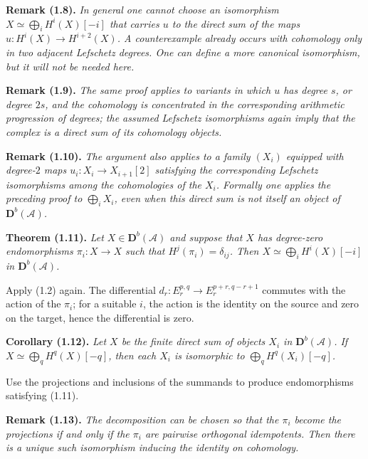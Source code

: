 \documentclass[11pt]{article}
\newcommand{\bD}{\mathbf D}
\newcommand{\cA}{\mathcal A}
\newenvironment{named}[1]{\par\medskip\noindent\textbf{#1}\itshape}{\par\medskip}
\begin{document}
\begin{named}{Remark (1.8).}
In general one cannot choose an isomorphism $X\simeq\bigoplus_iH^i(X)[-i]$ that carries $u$ to the direct sum of the maps $u:H^i(X)\to H^{i+2}(X)$. A counterexample already occurs with cohomology only in two adjacent Lefschetz degrees. One can define a more canonical isomorphism, but it will not be needed here.
\end{named}

\begin{named}{Remark (1.9).}
The same proof applies to variants in which $u$ has degree $s$, or degree $2s$, and the cohomology is concentrated in the corresponding arithmetic progression of degrees; the assumed Lefschetz isomorphisms again imply that the complex is a direct sum of its cohomology objects.
\end{named}

\begin{named}{Remark (1.10).}
The argument also applies to a family $(X_i)$ equipped with degree-$2$ maps $u_i:X_i\to X_{i+1}[2]$ satisfying the corresponding Lefschetz isomorphisms among the cohomologies of the $X_i$. Formally one applies the preceding proof to $\bigoplus_iX_i$, even when this direct sum is not itself an object of $\bD^b(\cA)$.
\end{named}

\begin{named}{Theorem (1.11).}
Let $X\in\bD^b(\cA)$ and suppose that $X$ has degree-zero endomorphisms $\pi_i:X\to X$ such that $H^j(\pi_i)=\delta_{ij}$. Then $X\simeq\bigoplus_iH^i(X)[-i]$ in $\bD^b(\cA)$.
\end{named}
Apply (1.2) again. The differential $d_r:E_r^{p,q}\to E_r^{p+r,q-r+1}$ commutes with the action of the $\pi_i$; for a suitable $i$, the action is the identity on the source and zero on the target, hence the differential is zero.

\begin{named}{Corollary (1.12).}
Let $X$ be the finite direct sum of objects $X_i$ in $\bD^b(\cA)$. If $X\simeq\bigoplus_qH^q(X)[-q]$, then each $X_i$ is isomorphic to $\bigoplus_qH^q(X_i)[-q]$.
\end{named}
Use the projections and inclusions of the summands to produce endomorphisms satisfying (1.11).

\begin{named}{Remark (1.13).}
The decomposition can be chosen so that the $\pi_i$ become the projections if and only if the $\pi_i$ are pairwise orthogonal idempotents. Then there is a unique such isomorphism inducing the identity on cohomology.
\end{named}
\end{document}

